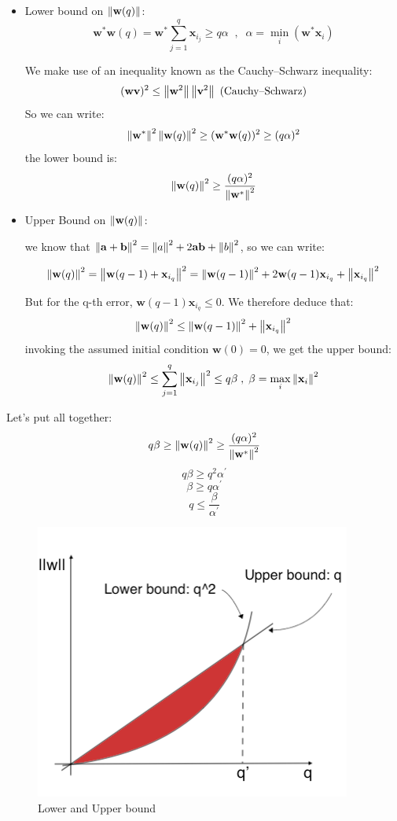\documentclass[../main.tex]{subfiles}
\begin{document}
\begin{itemize}
    \item Lower bound on $\left\lVert\mathbf{w}(q)\right\rVert$:
        $$ \mathbf{w^*w}(q) = \mathbf{w^*}\sum_{j = 1}^{q} \mathbf{x}_{i_j} \geq q\alpha \;\;,\;\; \alpha = \min_i (\mathbf{w^*}\mathbf{x}_i)$$
        
        We make use of an inequality known as the Cauchy–Schwarz inequality: 
        $$(\mathbf{wv})^2 \leq \left\lVert\mathbf{w}^2\right\rVert\left\lVert\mathbf{v}^2\right\rVert \text{  (Cauchy–Schwarz)}$$
        So we can write:
        $$ \left\lVert\mathbf{w^*}\right\rVert^2\left\lVert\mathbf{w}(q)\right\rVert^2 \geq (\mathbf{w^*w}(q))^2 \geq (q\alpha)^2$$
        the lower bound is:
        $$ \left\lVert\mathbf{w}(q)\right\rVert^2 \geq \frac{(q\alpha)^2}{\left\lVert\mathbf{w^*}\right\rVert^2}$$
        
    \item Upper Bound on $\left\lVert\mathbf{w}(q)\right\rVert$:
    \begin{center}
        we know that $\left\lVert\mathbf{a}+\mathbf{b}\right\rVert^2 = \left\lVert a\right\rVert^2 +2\mathbf{ab} + \left\lVert b\right\rVert^2$, so we can write:
    \end{center}
    $$ \left\lVert\mathbf{w}(q)\right\rVert^2 = \left\lVert\mathbf{w}(q-1)+ \mathbf{x}_{i_q}\right\rVert^2 = \left\lVert\mathbf{w}(q-1)\right\rVert^2  + 2\mathbf{w}(q-1)\mathbf{x}_{i_q} +\left\lVert\mathbf{x}_{i_q}\right\rVert^2 $$ 
    
    But for the q-th error, $\mathbf{w}(q-1)\mathbf{x}_{i_q} \leq 0$.  We therefore deduce that:
    $$ \left\lVert\mathbf{w}(q)\right\rVert^2 \leq  \left\lVert\mathbf{w}(q-1)\right\rVert^2 +\left\lVert\mathbf{x}_{i_q}\right\rVert^2$$
    invoking the assumed initial condition $\mathbf{w}(0) = 0$, we get the upper bound:
    $$ \left\lVert\mathbf{w}(q)\right\rVert^2 \leq \sum_{j = 1}^{q} \left\lVert\mathbf{x}_{i_j}\right\rVert^2 \leq q\beta \; , \; \beta = \max_i \left\lVert\mathbf{x}_i\right\rVert^2$$
\end{itemize}
Let's put all together:
$$ q\beta \geq \left\lVert\mathbf{w}(q)\right\rVert^2 \geq \frac{(q\alpha)^2}{\left\lVert\mathbf{w^*}\right\rVert^2}$$ 
$$ q\beta \geq q^2\alpha^{'}$$
$$ \beta \geq q\alpha^{'}$$
$$ q \leq \frac{\beta}{\alpha^{'}}$$

\begin{figure}[H]
    \centering
    \includegraphics[scale = 0.4]{lectures/4_neural_networks/4_placp.png}
    \caption{Lower and Upper bound}
    \label{fig:4_placp}
\end{figure}
\end{document}
